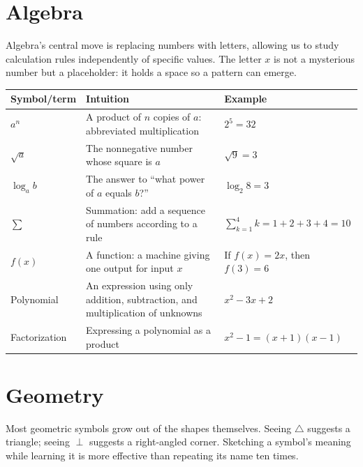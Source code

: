 \section{Algebra}

Algebra's central move is replacing numbers with letters, allowing us to study calculation rules independently of specific values. The letter $x$ is not a mysterious number but a placeholder: it holds a space so a pattern can emerge.

\begin{center}
\begin{tabular}{lp{4.8cm}p{5.4cm}}
\toprule
Symbol/term & Intuition & Example \\
\midrule
$a^n$ & A product of $n$ copies of $a$: abbreviated multiplication & $2^5=32$ \\
$\sqrt{a}$ & The nonnegative number whose square is $a$ & $\sqrt{9}=3$ \\
$\log_a b$ & The answer to ``what power of $a$ equals $b$?'' & $\log_2 8=3$ \\
$\sum$ & Summation: add a sequence of numbers according to a rule & $\sum_{k=1}^{4}k=1+2+3+4=10$ \\
$f(x)$ & A function: a machine giving one output for input $x$ & If $f(x)=2x$, then $f(3)=6$ \\
Polynomial & An expression using only addition, subtraction, and multiplication of unknowns & $x^2-3x+2$ \\
Factorization & Expressing a polynomial as a product & $x^2-1=(x+1)(x-1)$ \\
\bottomrule
\end{tabular}
\end{center}

\section{Geometry}

Most geometric symbols grow out of the shapes themselves. Seeing $\triangle$ suggests a triangle; seeing $\perp$ suggests a right-angled corner. Sketching a symbol's meaning while learning it is more effective than repeating its name ten times.

